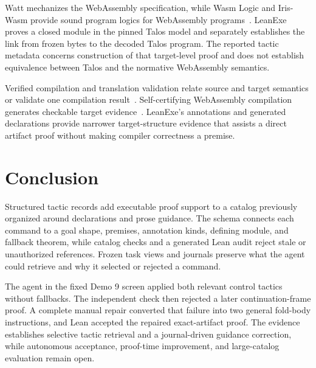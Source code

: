 \documentclass[10pt]{article}
\begin{document}
Watt mechanizes the WebAssembly specification, while Wasm Logic and Iris-Wasm provide sound program logics for WebAssembly programs~\cite{Watt2018Mechanising,Watt2019WasmLogic,Rao2023IrisWasm}.  LeanExe proves a closed module in the pinned Talos model and separately establishes the link from frozen bytes to the decoded Talos program.  The reported tactic metadata concerns construction of that target-level proof and does not establish equivalence between Talos and the normative WebAssembly semantics.

Verified compilation and translation validation relate source and target semantics or validate one compilation result~\cite{Leroy2009CompCert,Pnueli1998TranslationValidation}.  Self-certifying WebAssembly compilation generates checkable target evidence~\cite{Namjoshi2021SelfCertifying}.  LeanExe's annotations and generated declarations provide narrower target-structure evidence that assists a direct artifact proof without making compiler correctness a premise.

\section{Conclusion}

Structured tactic records add executable proof support to a catalog previously organized around declarations and prose guidance.  The schema connects each command to a goal shape, premises, annotation kinds, defining module, and fallback theorem, while catalog checks and a generated Lean audit reject stale or unauthorized references.  Frozen task views and journals preserve what the agent could retrieve and why it selected or rejected a command.

The agent in the fixed Demo 9 screen applied both relevant control tactics without fallbacks.  The independent check then rejected a later continuation-frame proof.  A complete manual repair converted that failure into two general fold-body instructions, and Lean accepted the repaired exact-artifact proof.  The evidence establishes selective tactic retrieval and a journal-driven guidance correction, while autonomous acceptance, proof-time improvement, and large-catalog evaluation remain open.

\renewcommand{\bibfont}{\footnotesize}


\end{document}
